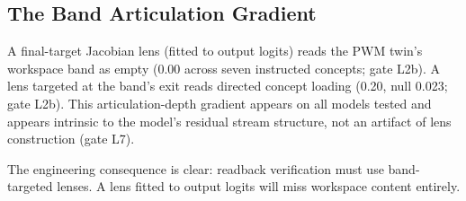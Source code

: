 \subsection*{The Band Articulation Gradient}

A final-target Jacobian lens (fitted to output logits) reads the PWM twin's workspace band as empty
(0.00 across seven instructed concepts; gate L2b).
A lens targeted at the band's exit reads directed concept loading (0.20, null 0.023; gate L2b).
This articulation-depth gradient appears on all models tested and appears intrinsic to the model's
residual stream structure, not an artifact of lens construction (gate L7).

The engineering consequence is clear: readback verification must use band-targeted lenses.
A lens fitted to output logits will miss workspace content entirely.
